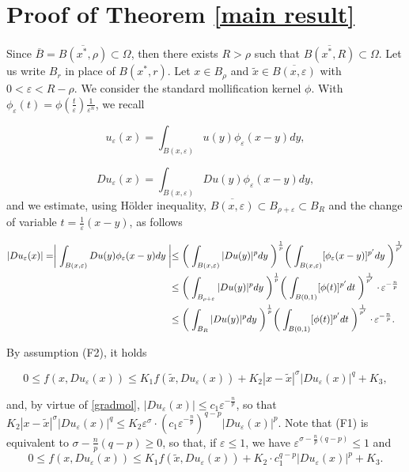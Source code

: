 \documentclass[a4paper,10pt]{article}
\theoremstyle{plain}
\theoremstyle{definition}
\numberwithin{equation}{section} \makeatletter
\begin{document}
\section{Proof of Theorem \ref{main result}}\label{sec proof}


\noindent
Since 
$\overline{B}=\overline{B(x^*,\rho)} \subset \Omega$, then there exists $R>\rho$ such that $\overline{B(x^*,R)} \subset \Omega$. Let us write $B_r$ in place of $B(x^*,r)$. 
Let $x \in B_{\rho}$ and 
$\tilde{x} \in \overline{B(x,\varepsilon)}$ with $0<\varepsilon< R-\rho$. We  consider the standard mollification kernel $\phi$. With $\phi_{\varepsilon}(t)=\phi(\frac t \varepsilon) \frac{1}{\varepsilon^n}$,  we recall

\[
u_\varepsilon(x)= \int_{B(x,\varepsilon)}u(y)\phi_{\varepsilon}(x-y) dy,
\]

\[
Du_\varepsilon(x)= \int_{B(x,\varepsilon)}Du(y)\phi_{\varepsilon}(x-y) dy,
\]
and we  estimate, using H\"older inequality, $\overline{B(x,\varepsilon)}\subset B_{\rho + \varepsilon} \subset B_{R}$ and the change of variable $t=\frac{1}{\varepsilon}(x-y)$, as follows
 
\begin{align}\label{gradmol}
|Du_\varepsilon(x)|= \biggm|\int_{B(x,\varepsilon)}Du(y)\phi_{\varepsilon}(x-y) dy\biggm|\le& \biggm(\int_{B(x,\varepsilon)} |Du(y)|^p dy\biggm)^{\frac 1 p} \biggm(\int_{B(x,\varepsilon)} [\phi_{\varepsilon}(x-y)]^{p'} dy\biggm)^{\frac 1 {p'}}\notag \\
\le& \biggm(\int_{B_{\rho + \varepsilon}} |Du(y)|^p dy\biggm)^{\frac 1 p} \biggm(\int_{B(0,1)} [\phi(t)]^{p'} dt\biggm)^{\frac 1 {p'}} \cdot \, \varepsilon^{- \frac{n}{p}}\notag \\
\le& \biggm(\int_{B_{R}} |Du(y)|^p dy\biggm)^{\frac 1 p} \biggm(\int_{B(0,1)} [\phi(t)]^{p'} dt\biggm)^{\frac 1 {p'}} \cdot \,\varepsilon^{- \frac{n}{p}}.\notag \\
\end{align}


\noindent By assumption (F2),  it holds

\[
0\le f(x,Du_\varepsilon(x))\le K_1 f(\tilde{x},Du_\varepsilon(x))+K_2|x-\tilde{x}|^{\sigma}|Du_\varepsilon(x)|^q +K_3,
\]

\noindent and, by virtue of \eqref{gradmol}, $|Du_\varepsilon(x)|\le c_1 \varepsilon^{- \frac{n}{p}}$, so that $K_2|x-\tilde{x}|^{\sigma}|Du_\varepsilon(x)|^q \le K_2 \varepsilon^{\sigma} \cdot ( c_1 \varepsilon^{- \frac{n}{p}})^{q-p}|Du_\varepsilon(x)|^p$.
Note that (F1) is equivalent to $\sigma - \frac{n}{p}(q-p)\ge 0 $, so that, if
$\varepsilon \le 1$, we have 
$\varepsilon^{\sigma - \frac{n}{p}(q-p)} \leq 1$
and
\[
0\le f(x,Du_\varepsilon(x))\le K_1 f(\tilde{x},Du_\varepsilon(x))+K_2\cdot c_1^{q-p}|Du_\varepsilon(x)|^p +K_3.
\]
\end{document}
